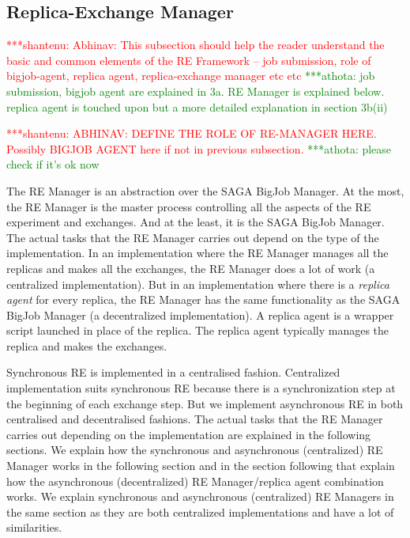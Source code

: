 \documentclass{rspublic}
\newcommand{\jhanote}[1]{ {\textcolor{red} { ***shantenu: #1 }}}
\newcommand{\alnote}[1]{ {\textcolor{blue} { ***andre: #1 }}}
\newcommand{\athotanote}[1]{ {\textcolor{green} { ***athota: #1 }}}
\newcommand{\alnote}[1]{}
\newcommand{\athotanote}[1]{}
\newcommand{\jhanote}[1]{}
\begin{document}
\subsection{Replica-Exchange Manager}\label{repexmanager} 

\jhanote{Abhinav: This subsection should help the reader understand
  the basic and common elements of the RE Framework -- job submission,
  role of bigjob-agent, replica agent, replica-exchange manager etc
  etc} \athotanote{job submission, bigjob agent are explained in 3a. RE Manager is explained below. replica agent is touched upon but a more detailed explanation in section 3b(ii)}
  
  \jhanote{ABHINAV: DEFINE THE ROLE OF RE-MANAGER HERE.  Possibly BIGJOB
  AGENT here if not in previous subsection.}  \athotanote{please check if it's ok now}
  
The RE Manager is an abstraction over the SAGA BigJob Manager. At the most, the RE Manager is the master process controlling all the aspects of the RE experiment and exchanges. And at the least, it is the SAGA BigJob Manager. The actual tasks that the RE Manager carries out depend on the type of the implementation. In an implementation where the RE Manager manages all the replicas and makes all the exchanges, the RE Manager does a lot of work (a centralized implementation). But in an implementation where there is a \emph{replica agent} for every replica, the RE Manager has the same functionality as the SAGA BigJob Manager (a decentralized implementation). A replica agent is a wrapper script launched in place of the replica. The replica agent typically manages the replica and makes the exchanges.

Synchronous RE is implemented in a centralised
fashion. Centralized implementation suits synchronous RE because there is a synchronization step at the beginning of each
exchange step. But we implement asynchronous RE in both centralised and
decentralised fashions. The actual tasks that the RE Manager carries out depending on the implementation are explained in the following sections. 
We explain how the synchronous and asynchronous (centralized) RE Manager works in the following section and in the section following that explain how the asynchronous (decentralized) RE Manager/replica agent combination works. We explain synchronous and asynchronous (centralized) RE Managers in the same section as they are both centralized implementations and have a lot of similarities. 

\end{document}
